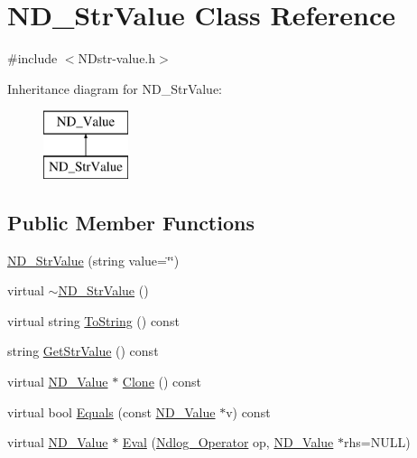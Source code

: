 \hypertarget{class_n_d___str_value}{\section{N\-D\-\_\-\-Str\-Value Class Reference}
\label{class_n_d___str_value}
}


{\ttfamily \#include $<$N\-Dstr-\/value.\-h$>$}

Inheritance diagram for N\-D\-\_\-\-Str\-Value\-:\begin{figure}[H]
\begin{center}
\leavevmode
\includegraphics[height=2.000000cm]{class_n_d___str_value}
\end{center}
\end{figure}
\subsection*{Public Member Functions}
\begin{DoxyCompactItemize}
\item 
\hyperlink{class_n_d___str_value_adb14fb5f9d17ab44686c6903ac27ef13}{N\-D\-\_\-\-Str\-Value} (string value=\char`\"{}\char`\"{})
\item 
virtual \hyperlink{class_n_d___str_value_afe723c06bd221211fabeb29c1900d9aa}{$\sim$\-N\-D\-\_\-\-Str\-Value} ()
\item 
virtual string \hyperlink{class_n_d___str_value_a48e3142b60cf2e9298b3eb1eb2849a33}{To\-String} () const 
\item 
string \hyperlink{class_n_d___str_value_a668844f812674752e89a30b51ac3ebdc}{Get\-Str\-Value} () const 
\item 
virtual \hyperlink{class_n_d___value}{N\-D\-\_\-\-Value} $\ast$ \hyperlink{class_n_d___str_value_aeb136b399c70bf7efde0a2029db2d3e0}{Clone} () const 
\item 
virtual bool \hyperlink{class_n_d___str_value_a9096679205abd233f412babb02d3c18b}{Equals} (const \hyperlink{class_n_d___value}{N\-D\-\_\-\-Value} $\ast$v) const 
\item 
virtual \hyperlink{class_n_d___value}{N\-D\-\_\-\-Value} $\ast$ \hyperlink{class_n_d___str_value_abb603d9a1fbf618e578d921d15119b52}{Eval} (\hyperlink{_n_dvalue_8h_afc938fb729c95de25b4d2eb18640b303}{Ndlog\-\_\-\-Operator} op, \hyperlink{class_n_d___value}{N\-D\-\_\-\-Value} $\ast$rhs=N\-U\-L\-L)
\end{DoxyCompactItemize}
